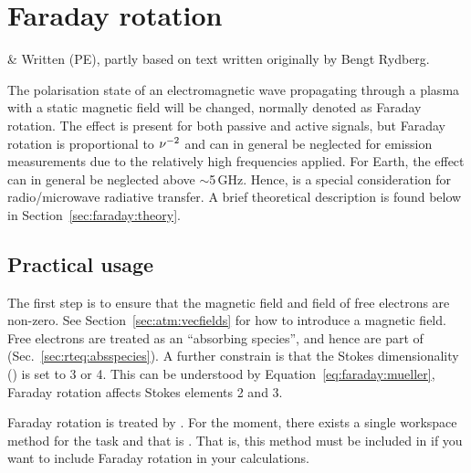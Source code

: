 \chapter{Faraday rotation}
 \label{sec:faraday}

 & Written (PE), partly based on text written originally by 
          Bengt Rydberg.
\stophistory

The polarisation state of an electromagnetic wave propagating through a plasma
with a static magnetic field will be changed, normally denoted as Faraday
rotation. The effect is present for both passive and active signals, but
Faraday rotation is proportional to $\nu^{-2}$ and can in general be neglected
for emission measurements due to the relatively high frequencies applied. For
Earth, the effect can in general be neglected above
$\sim$5\,GHz. Hence,  is a special consideration
for radio/microwave radiative transfer. A brief theoretical description is
found below in Section~\ref{sec:faraday:theory}. 



\section{Practical usage}
\label{sec:faraday:arts}
%
The first step is to ensure that the magnetic field and field of free electrons
are non-zero. See Section~\ref{sec:atm:vecfields} for how to introduce a
magnetic field. Free electrons are treated as an ``absorbing species'', and
hence are part of  (Sec.~\ref{sec:rteq:absspecies}). A
further constrain is that the Stokes dimensionality () is
set to 3 or 4. This can be understood by Equation~\ref{eq:faraday:mueller},
Faraday rotation affects Stokes elements 2 and 3.

Faraday rotation is treated by . For the
moment, there exists a single workspace method for the task and that is
. That is, this method must be included
in  if you want to include Faraday
rotation in your calculations.





